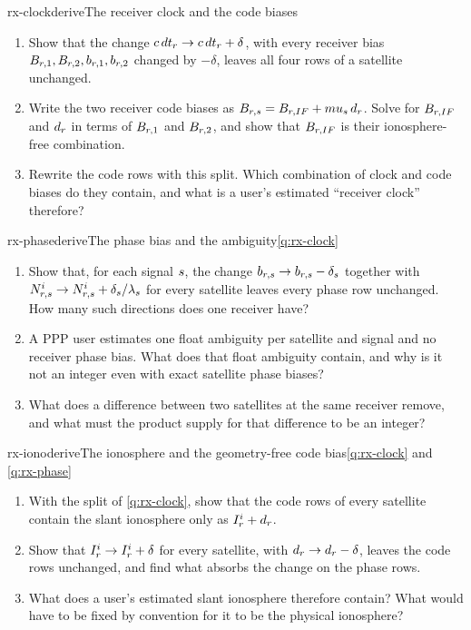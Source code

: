 \begin{question}{rx-clock}{derive}{The receiver clock and the code biases}{}
\begin{enumerate}[leftmargin=*, itemsep=1pt]
\item Show that the change $c\,dt_r \to c\,dt_r + \delta$,
      with every receiver bias $B_{r,1}, B_{r,2}, b_{r,1}, b_{r,2}$ changed
      by $-\delta$, leaves all four rows of a satellite unchanged.
\item Write the two receiver code biases as
      $B_{r,s} = B_{r,IF} + mu_s\, d_r$. Solve for
      $B_{r,IF}$ and $d_r$ in terms of $B_{r,1}$ and $B_{r,2}$,
      and show that $B_{r,IF}$ is their ionosphere-free combination.
\item Rewrite the code rows with this split. Which combination of clock and code
      biases do they contain, and what is a user's estimated ``receiver clock''
      therefore?
\end{enumerate}
\end{question}

\begin{question}{rx-phase}{derive}{The phase bias and the ambiguity}{\ref{q:rx-clock}}
\begin{enumerate}[leftmargin=*, itemsep=1pt]
\item Show that, for each signal $s$, the change
      $b_{r,s} \to b_{r,s} - \delta_s$ together with
      $N^i_{r,s} \to N^i_{r,s} + \delta_s/\lambda_s$ for
      every satellite leaves every phase row unchanged. How many such directions
      does one receiver have?
\item A PPP user estimates one float ambiguity per satellite and signal and no
      receiver phase bias. What does that float ambiguity contain, and why is it
      not an integer even with exact satellite phase biases?
\item What does a difference between two satellites at the same receiver
      remove, and what must the product supply for that difference to be an
      integer?
\end{enumerate}
\end{question}

\begin{question}{rx-iono}{derive}{The ionosphere and the geometry-free code bias}{\ref{q:rx-clock} and \ref{q:rx-phase}}
\begin{enumerate}[leftmargin=*, itemsep=1pt]
\item With the split of \cref{q:rx-clock}, show that the code rows of every
      satellite contain the slant ionosphere only as $I^i_r + d_r$.
\item Show that $I^i_r \to I^i_r + \delta$ for every satellite, with
      $d_r \to d_r - \delta$, leaves the code rows unchanged, and find what
      absorbs the change on the phase rows.
\item What does a user's estimated slant ionosphere therefore contain? What
      would have to be fixed by convention for it to be the physical ionosphere?
\end{enumerate}
\end{question}

